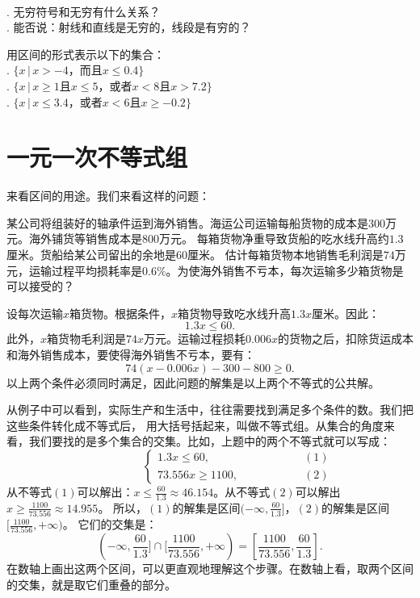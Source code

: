 \documentclass[12pt,UTF8]{ctexbook}
\begin{document}
\begin{sk}\label{sk:5-4-0}
    \mbox{}\\
    . 无穷符号和无穷有什么关系？\\
    . 能否说：射线和直线是无穷的，线段是有穷的？
\end{sk}
\begin{xt}\label{xt:5-4-0}
    用区间的形式表示以下的集合：\\
    . $\{x \, | \, x > -4 \mbox{，而且} x \leqslant 0.4 \}$ \\
    . $\{x \, | \, x \geqslant 1 \mbox{且} x \leqslant 5 \mbox{，或者} x < 8  \mbox{且} x > 7.2 \}$ \\
    . $\{x \, | \, x \leqslant 3.4 \mbox{，或者} x < 6  \mbox{且} x \geqslant -0.2 \}$
\end{xt}

\section{一元一次不等式组}
来看区间的用途。我们来看这样的问题：
\begin{ex}\label{ex:5-5-0}
    某公司将组装好的轴承件运到海外销售。海运公司运输每船货物的成本是$300$万元。海外铺货等销售成本是$800$万元。
    每箱货物净重导致货船的吃水线升高约$1.3$厘米。货船给某公司留出的余地是$60$厘米。
    估计每箱货物本地销售毛利润是$74$万元，运输过程平均损耗率是$0.6\%$。为使海外销售不亏本，每次运输多少箱货物是可以接受的？
\end{ex}

\begin{so}
    设每次运输$x$箱货物。根据条件，$x$箱货物导致吃水线升高$1.3x$厘米。因此：
    $$ 1.3x \leqslant  60.$$
    此外，$x$箱货物毛利润是$74x$万元。运输过程损耗$0.006x$的货物之后，扣除货运成本和海外销售成本，要使得海外销售不亏本，要有：
    $$ 74 (x - 0.006x) - 300 - 800 \geqslant 0. $$
    以上两个条件必须同时满足，因此问题的解集是以上两个不等式的公共解。
\end{so}

从例子中可以看到，实际生产和生活中，往往需要找到满足多个条件的数。我们把这些条件转化成不等式后，
用大括号括起来，叫做不等式组。从集合的角度来看，我们要找的是多个集合的交集。比如，上题中的两个不等式就可以写成：
$$ \quad \quad \quad \quad \quad\left\{
\begin{array}{cr}
    1.3x \leqslant 60, & \quad \quad \quad \quad \quad (1) \\
    73.556x \geqslant 1100, & \quad \quad \quad \quad \quad (2)
\end{array}\right.
$$
从不等式$(1)$可以解出：$x \leqslant \frac{60}{1.3} \approx 46.154$。从不等式$(2)$可以解出$x \geqslant \frac{1100}{73.556} \approx 14.955$。
所以，$(1)$的解集是区间$(-\infty, \frac{60}{1.3}]$，$(2)$的解集是区间$[\frac{1100}{73.556}, +\infty)$。
它们的交集是：
$$(-\infty, \frac{60}{1.3}] \cap [\frac{1100}{73.556}, +\infty)  = [\frac{1100}{73.556}, \frac{60}{1.3}]. $$
在数轴上画出这两个区间，可以更直观地理解这个步骤。在数轴上看，取两个区间的交集，就是取它们重叠的部分。
\end{document}
